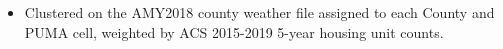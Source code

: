 \begin{itemize}
\item Clustered on the AMY2018 county weather file assigned to each County and PUMA cell, weighted by ACS 2015-2019 5-year housing unit counts.
\end{itemize}
